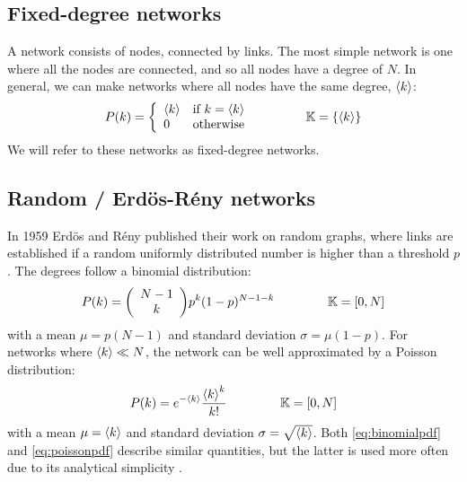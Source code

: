 \subsection{Fixed-degree networks}
\noindent A network consists of nodes, connected by links. The most simple network is one where all the nodes are connected, and so all nodes have a degree of $N$. In general, we can make networks where all nodes have the same degree, ${\langle k\rangle}$:
\begin{align}
P(k) = \left\{\begin{array}{ll}\kmean & \text{if } k=\kmean \\0 & \text{otherwise}\end{array}\right. \hspace{15mm} \K = \{ \kmean \} \label{eq:diracpdf}
\end{align}
We will refer to these networks as fixed-degree networks.


\subsection{Random / Erd{\"o}s-R{\'e}ny networks}
In 1959 Erd{\"o}s and R{\'e}ny published their work on random graphs\cite{RandomGraphs1959}, where links are established if a random uniformly distributed number is higher than a threshold $p$. The degrees follow a binomial distribution: 
\begin{align}
P(k)=\left(\begin{array}{c}N-1 \\ k\end{array}\right) p^{k}(1-p)^{N-1-k}  \hspace{15mm} \K = [0,N] \label{eq:binomialpdf}
\end{align}
with a mean $\mu = p(N-1)$ and standard deviation $\sigma = \mu(1-p)$. For networks where ${\langle k\rangle} \ll N$, the network can be well approximated by a Poisson distribution:
\begin{align}
P(k) = e^{-\kmean} \frac{\kmean^{k}}{k !} \hspace{15mm} \K = [0,N] \label{eq:poissonpdf}
\end{align}
with a mean $\mu = {\langle k\rangle}$ and standard deviation $\sigma = \sqrt{{\langle k\rangle}}$. Both \eqref{eq:binomialpdf} and \eqref{eq:poissonpdf} describe similar quantities, but the latter is used more often due to its analytical simplicity \cite{BarabasiNetworkBook2016}.


